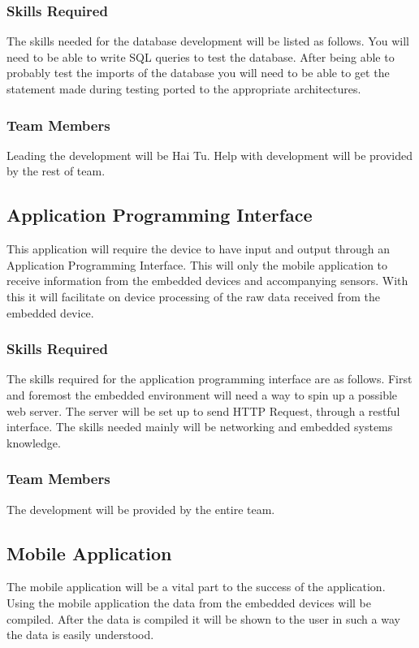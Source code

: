 \documentclass{article}
\begin{document}
\subsubsection{Skills Required}
The skills needed for the database development will be listed as follows.
You will need to be able to write SQL queries to test the database.
After being able to probably test the imports of the database you will need to be able to get the statement made during testing ported to the appropriate architectures.

\subsubsection{Team Members}
Leading the development will be Hai Tu.
Help with development will be provided by the rest of team.




\subsection{Application Programming Interface}

This application will require the device to have input and output through an Application Programming Interface.
This will only the mobile application to receive information from the embedded devices and accompanying sensors.
With this it will facilitate on device processing of the raw data received from the embedded device.

\subsubsection{Skills Required}

The skills required for the application programming interface are as follows. 
First and foremost the embedded environment will need a way to spin up a possible web server. 
The server will be set up to send HTTP Request, through a restful interface.
The skills needed mainly will be networking and embedded systems knowledge.

\subsubsection{Team Members}
The development will be provided by the entire team.

\subsection{Mobile Application}
The mobile application will be a vital part to the success of the application.
Using the mobile application the data from the embedded devices will be compiled.
After the data is compiled it will be shown to the user in such a way the data is easily understood.
\end{document}
